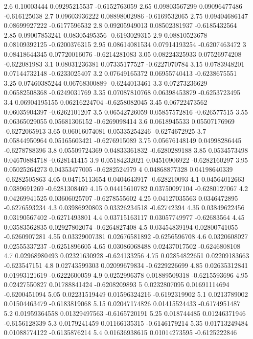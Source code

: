 {2.6 0.10003444 0.09295215537 -0.6152763059
2.65 0.09803567299 0.09096477486 -0.616125038
2.7 0.09603936222 0.08898002986 -0.6169532065
2.75 0.09404686147 0.08699927222 -0.6177596532
2.8 0.09205949013 0.08502381937 -0.6185432564
2.85 0.09007853241 0.08305495356 -0.6193029315
2.9 0.08810523678 0.08109392125 -0.6200376315
2.95 0.08614081534 0.07914193254 -0.6207463472
3 0.08418644345 0.07720016076 -0.6214281083
3.05 0.08224325933 0.07526974208 -0.622081983
3.1 0.08031236381 0.07335177527 -0.6227070784
3.15 0.0783948201 0.07144732148 -0.6233025407
3.2 0.07649165372 0.06955740413 -0.6238675551
3.25 0.07460385244 0.06768300889 -0.6244013461
3.3 0.07273236629 0.06582508368 -0.6249031769
3.35 0.07087810768 0.06398453879 -0.6253723495
3.4 0.06904195155 0.06216224704 -0.6258082045
3.45 0.06722473562 0.06035904397 -0.6262101207
3.5 0.06542726059 0.05857572816 -0.626577515
3.55 0.06365029055 0.05681306152 -0.6269098414
3.6 0.0618945533 0.05507176969 -0.6272065913
3.65 0.06016074081 0.05335254246 -0.6274672925
3.7 0.05844950964 0.05165603421 -0.6276915089
3.75 0.05676148149 0.04998286445 -0.6278788396
3.8 0.05509724369 0.04833361832 -0.6280289188
3.85 0.0534573498 0.04670884718 -0.628141415
3.9 0.05184232021 0.04510906922 -0.6282160297
3.95 0.05025264273 0.04353477005 -0.6282524979
4 0.04868877328 0.04198640339 -0.6282505863
4.05 0.04715113654 0.0404643917 -0.628210093
4.1 0.04564012663 0.0389691269 -0.6281308469
4.15 0.04415610782 0.03750097104 -0.6280127067
4.2 0.04269941525 0.03606025707 -0.6278555602
4.25 0.04127035563 0.0346472895 -0.6276593234
4.3 0.03986920803 0.03326234518 -0.62742394
4.35 0.03849622456 0.03190567402 -0.6271493801
4.4 0.03715163117 0.03057749977 -0.62683564
4.45 0.03583562835 0.02927802074 -0.6264827408
4.5 0.03454839194 0.02800741055 -0.6260907281
4.55 0.03329007381 0.02676581892 -0.6256596708
4.6 0.0320608027 0.02555337237 -0.6251896605
4.65 0.03086068488 0.02437017502 -0.6246808108
4.7 0.02968980493 0.02321630928 -0.624133256
4.75 0.02854822651 0.02209183663 -0.623547151
4.8 0.02743599303 0.02099679834 -0.6229226699
4.85 0.02635312841 0.01993121619 -0.6222600059
4.9 0.0252996378 0.01889509318 -0.6215593696
4.95 0.02427550827 0.01788841424 -0.6208209893
5 0.0232807095 0.01691114694 -0.6200451094
5.05 0.02231519449 0.01596324216 -0.6192319902
5.1 0.0213789002 0.01504463479 -0.6183819068
5.15 0.02047174826 0.01415524433 -0.6174951487
5.2 0.01959364558 0.01329497563 -0.6165720191
5.25 0.018744485 0.01246371946 -0.6156128339
5.3 0.0179241459 0.01166135315 -0.6146179214
5.35 0.01713249484 0.01088774122 -0.6135876214
5.4 0.01636938615 0.01014273595 -0.6125222846
}
